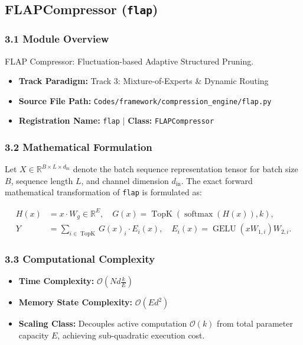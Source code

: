 \subsection{FLAPCompressor (\texttt{flap})}
\label{sec:app_module_flap}

\subsubsection*{3.1 Module Overview}
FLAP Compressor: Fluctuation-based Adaptive Structured Pruning.
\begin{itemize}
    \item \textbf{Track Paradigm:} Track 3: Mixture-of-Experts & Dynamic Routing
    \item \textbf{Source File Path:} \texttt{Codes/framework/compression\_engine/flap.py}
    \item \textbf{Registration Name:} \texttt{flap} $\mid$ \textbf{Class:} \texttt{FLAPCompressor}
\end{itemize}

\subsubsection*{3.2 Mathematical Formulation}
Let $X \in \mathbb{R}^{B \times L \times d_{\text{in}}}$ denote the batch sequence representation tensor for batch size $B$, sequence length $L$, and channel dimension $d_{\text{in}}$. The exact forward mathematical transformation of \texttt{flap} is formulated as:

\begin{align}
H(x) &= x \cdot W_g \in \mathbb{R}^{E}, \quad G(x) = \operatorname{TopK}\left(\operatorname{softmax}(H(x)), k\right), \\
Y &= \sum_{i \in \operatorname{TopK}} G(x)_i \cdot E_i(x), \quad E_i(x) = \operatorname{GELU}(x W_{1, i}) W_{2, i}.
\end{align}


\subsubsection*{3.3 Computational Complexity}
\begin{itemize}
    \item \textbf{Time Complexity:} $\mathcal{O}(N d \frac{k}{E})$
    \item \textbf{Memory State Complexity:} $\mathcal{O}(E d^2)$
    \item \textbf{Scaling Class:} Decouples active computation $\mathcal{O}(k)$ from total parameter capacity $E$, achieving sub-quadratic execution cost.
\end{itemize}

